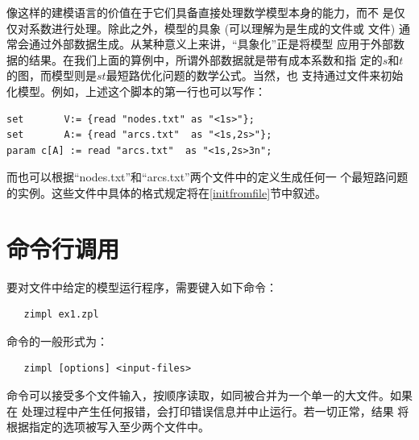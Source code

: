\medskip

像\zimpl 这样的建模语言的价值在于它们具备直接处理数学模型本身的能力，而不
是仅仅对系数进行处理。除此之外，模型的具象 (可以理解为是生成的\lpf 文件或
\mps 文件) 通常会通过外部数据生成。从某种意义上来讲，“具象化”正是将模型
应用于外部数据的结果。在我们上面的算例中，所谓外部数据就是带有成本系数和指
定的$s$和$t$的图，而模型则是$st$最短路优化问题的数学公式。当然，\zimpl 也
支持通过文件来初始化模型。例如，上述这个\zimpl 脚本的第一行也可以写作：%
{\small
\begin{verbatim}
set       V:= {read "nodes.txt" as "<1s>"};
set       A:= {read "arcs.txt"  as "<1s,2s>"};
param c[A] := read "arcs.txt"  as "<1s,2s>3n";
\end{verbatim}
} 而\zimpl 也可以根据“nodes.txt”和“arcs.txt”两个文件中的定义生成任何一
个最短路问题的实例。这些文件中具体的格式规定将在\ref{initfromfile}节中叙述。

\section{命令行调用}

要对文件中给定的模型运行\zimpl 程序，需要键入如下命令：
\begin{verbatim}
   zimpl ex1.zpl
\end{verbatim}
命令的一般形式为：
\begin{verbatim}
   zimpl [options] <input-files>
\end{verbatim}
命令可以接受多个文件输入，按顺序读取，如同被合并为一个单一的大文件。如果在
处理过程中产生任何报错，\zimpl 会打印错误信息并中止运行。若一切正常，结果
将根据指定的选项被写入至少两个文件中。

